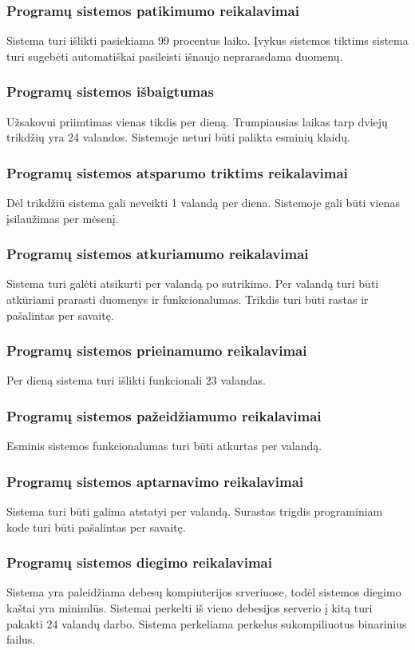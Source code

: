 \documentclass{VUMIFPSkursinis}
\begin{document}
	\subsubsection{Programų sistemos patikimumo reikalavimai}
		Sistema turi išlikti pasiekiama 99 procentus laiko.
		Įvykus sistemos tiktims sistema turi sugebėti automatiškai pasileisti išnaujo neprarasdama duomenų.
	\subsubsection{Programų sistemos išbaigtumas}
		Užsakovui priimtimas vienas tikdis per dieną.
		Trumpiausias laikas tarp dviejų trikdžių yra 24 valandos.
		Sistemoje neturi būti palikta esminių klaidų.
	\subsubsection{Programų sistemos atsparumo triktims reikalavimai}
		Dėl trikdžiū sistema gali neveikti 1 valandą per diena.
		Sistemoje gali būti vienas įsilaužimas per mėsenį.
	\subsubsection{Programų sistemos atkuriamumo reikalavimai}
		Sistema turi galėti atsikurti per valandą po sutrikimo.
		Per valandą turi būti atkūriami prarasti duomenys ir funkcionalumas.
		Trikdis turi būti rastas ir pašalintas per savaitę.
		
	\subsubsection{Programų sistemos prieinamumo reikalavimai}
		Per dieną sistema turi išlikti funkcionali 23 valandas. 
	\subsubsection{Programų sistemos pažeidžiamumo reikalavimai}
		Esminis sistemos funkcionalumas turi būti atkurtas per valandą.
	\subsubsection{Programų sistemos aptarnavimo reikalavimai}
		Sistema turi būti galima atstatyi per valandą.
		Surastas trigdis programiniam kode turi būti pašalintas per savaitę.
	\subsubsection{Programų sistemos diegimo reikalavimai}
		Sistema yra paleidžiama debesų kompiuterijos srveriuose, todėl sistemos diegimo kaštai yra minimlūs.
		Sistemai perkelti iš vieno debesijos serverio į kitą turi pakakti 24 valandų darbo.
		Sistema perkeliama perkelus sukompiliuotus binarinius failus.
\end{document}
